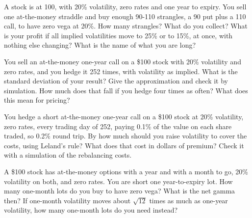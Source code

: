 \begin{question}\label{iq:iv2:options-parity-and-greeks:40}
A stock is at 100, with 20\% volatility, zero rates and one year to expiry. You sell one at-the-money straddle and buy enough 90-110 strangles, a 90 put plus a 110 call, to have zero vega at 20\%. How many strangles? What do you collect? What is your profit if all implied volatilities move to 25\% or to 15\%, at once, with nothing else changing? What is the name of what you are long?
\end{question}

\begin{question}\label{iq:iv2:options-parity-and-greeks:41}
You sell an at-the-money one-year call on a \$100 stock with 20\% volatility and zero rates, and you hedge it 252 times, with volatility as implied. What is the standard deviation of your result? Give the approximation and check it by simulation. How much does that fall if you hedge four times as often? What does this mean for pricing?
\end{question}

\begin{question}\label{iq:iv2:options-parity-and-greeks:42}
You hedge a short at-the-money one-year call on a \$100 stock at 20\% volatility, zero rates, every trading day of 252, paying 0.1\% of the value on each share traded, so 0.2\% round trip. By how much should you raise volatility to cover the costs, using Leland's rule? What does that cost in dollars of premium? Check it with a simulation of the rebalancing costs.
\end{question}

\begin{question}\label{iq:iv2:options-parity-and-greeks:43}
A \$100 stock has at-the-money options with a year and with a month to go, 20\% volatility on both, and zero rates. You are short one year-to-expiry lot. How many one-month lots do you buy to have zero vega? What is the net gamma then? If one-month volatility moves about $\sqrt{12}$ times as much as one-year volatility, how many one-month lots do you need instead?
\end{question}


